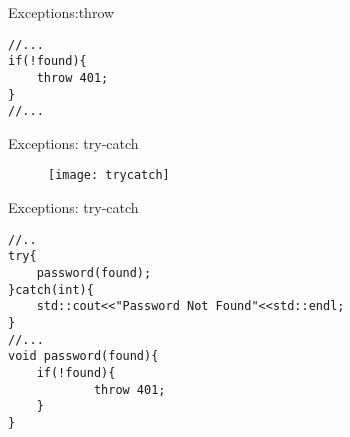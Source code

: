 \documentclass[xcolor={dvipsnames}]{beamer}
\begin{document}
\begin{frame}[fragile]{Exceptions:throw}
\begin{verbatim}
//...
if(!found){
    throw 401;
}
//...
\end{verbatim}
\end{frame}

\begin{frame}{Exceptions: try-catch}
\begin{center}	
	\begin{figure}
		\texttt{[image: trycatch]}
	\end{figure}
\end{center}
\end{frame}


\begin{frame}[fragile]{Exceptions: try-catch}
\begin{verbatim}
//..
try{
   	password(found);
}catch(int){
    std::cout<<"Password Not Found"<<std::endl;
}
//...
void password(found){
    if(!found){
        	throw 401;
    }
}
\end{verbatim}
\end{frame}
\end{document}
